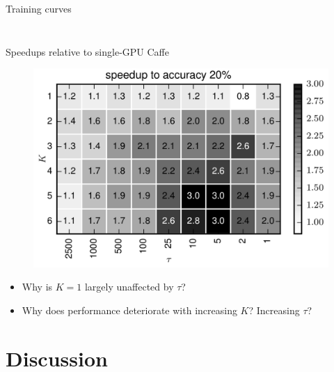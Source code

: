 \documentclass[pdf]{beamer}
\begin{document}
\begin{frame}[t]{Training curves}
\begin{columns}
\begin{column}{0.5\textwidth}
\begin{figure}[htpb]
            \end{figure}
        \end{column}
    \end{columns}
\end{frame}

\begin{frame}{Speedups relative to single-GPU Caffe}
    \begin{figure}[htpb]
        \centering
        \includegraphics[width=0.6\linewidth]{Figures/grid.png}
    \end{figure}
    \begin{itemize}
        \item Why is $K=1$ largely unaffected by $\tau$?
        \item Why does performance deteriorate with increasing $K$?
            Increasing $\tau$?
    \end{itemize}
\end{frame}

\section{Discussion}
\end{document}
